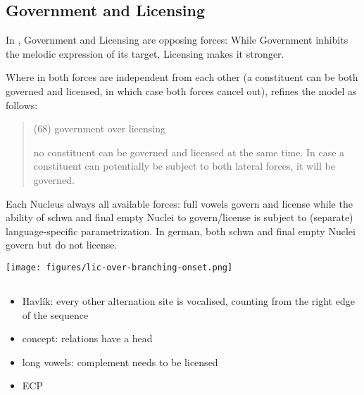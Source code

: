 \subsection{Government and Licensing}
\label{subsec:intro:gov lic}

In \CVCV, Government and Licensing are opposing forces:
While Government inhibits the melodic expression of
its target, Licensing makes it stronger.

Where in \cite{scheer2004} both forces are independent
from each other (a constituent can be both governed
and licensed, in which case both forces cancel out),
\cite{scheer2012} refines the model as follows:
\blockquote[\cite{scheer2012}]{
  (68) government over licensing
  
  no constituent can be governed and licensed at the
  same time. In case a constituent can potentially be
  subject to both lateral forces, it will be governed.
}

Each Nucleus always 
all available forces: full vowels govern and license
while the ability of schwa and final empty Nuclei to
govern/license is subject to (separate) language-specific
parametrization.
In german, both schwa and final empty Nuclei govern but
do not license.

\texttt{[image: figures/lic-over-branching-onset.png]}


\subsection[TODO]{\TODO{}}
\begin{itemize}\color{red}
  \item Havlík: every other alternation site is vocalised,
    counting from the right edge of the sequence\par
  \item concept: relations have a head
  \item long vowels: complement needs to be licensed
  \item \gls{ECP}
\end{itemize}